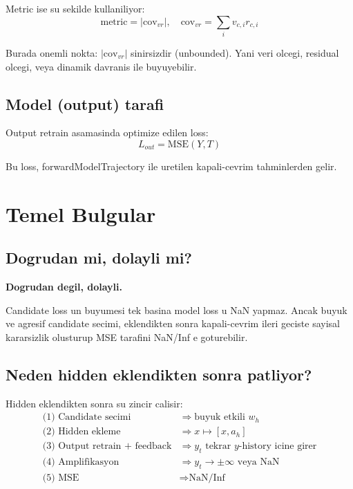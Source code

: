 \documentclass[12pt,a4paper]{article}
\begin{document}
Metric ise su sekilde kullaniliyor:
\begin{equation}
\text{metric} = |\text{cov}_{vr}|, \quad
\text{cov}_{vr} = \sum_i v_{c,i} r_{c,i}
\end{equation}

Burada onemli nokta: \( |\text{cov}_{vr}| \) sinirsizdir (unbounded).
Yani veri olcegi, residual olcegi, veya dinamik davranis ile buyuyebilir.

\subsection{Model (output) tarafi}
Output retrain asamasinda optimize edilen loss:
\begin{equation}
L_{out} = \text{MSE}(Y, T)
\end{equation}

Bu loss, forwardModelTrajectory ile uretilen kapali-cevrim tahminlerden gelir.

\section{Temel Bulgular}
\subsection{Dogrudan mi, dolayli mi?}
\textbf{Dogrudan degil, dolayli.}

Candidate loss un buyumesi tek basina model loss u NaN yapmaz.
Ancak buyuk ve agresif candidate secimi, eklendikten sonra kapali-cevrim ileri geciste
sayisal kararsizlik olusturup MSE tarafini NaN/Inf e goturebilir.

\subsection{Neden hidden eklendikten sonra patliyor?}
Hidden eklendikten sonra su zincir calisir:
\begin{align}
\text{(1) Candidate secimi} &\Rightarrow \text{buyuk etkili } w_h \\
\text{(2) Hidden ekleme} &\Rightarrow x \mapsto [x, a_h] \\
\text{(3) Output retrain + feedback} &\Rightarrow y_t \text{ tekrar } y\text{-history icine girer} \\
\text{(4) Amplifikasyon} &\Rightarrow y_t \to \pm\infty \text{ veya NaN} \\
\text{(5) MSE} &\Rightarrow \text{NaN/Inf}
\end{align}
\end{document}
